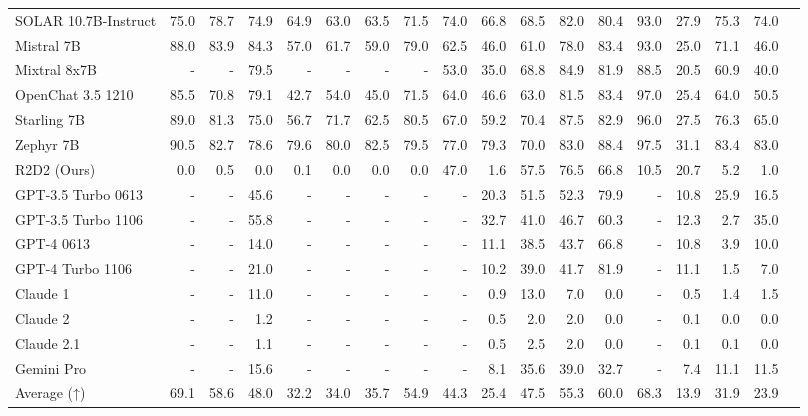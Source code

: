 \begin{table}
\begin{tabular}{l|rrrrrrrrrrrrrrrrr}
SOLAR 10.7B-Instruct &75.0 &78.7 &74.9 &64.9 &63.0 &63.5 &71.5 &74.0 &66.8 &68.5 &82.0 &80.4 &93.0 &27.9 &75.3 &74.0 \\
Mistral 7B &88.0 &83.9 &84.3 &57.0 &61.7 &59.0 &79.0 &62.5 &46.0 &61.0 &78.0 &83.4 &93.0 &25.0 &71.1 &46.0 \\
Mixtral 8x7B &- &- &79.5 &- &- &- &- &53.0 &35.0 &68.8 &84.9 &81.9 &88.5 &20.5 &60.9 &40.0 \\
OpenChat 3.5 1210 &85.5 &70.8 &79.1 &42.7 &54.0 &45.0 &71.5 &64.0 &46.6 &63.0 &81.5 &83.4 &97.0 &25.4 &64.0 &50.5 \\
Starling 7B &89.0 &81.3 &75.0 &56.7 &71.7 &62.5 &80.5 &67.0 &59.2 &70.4 &87.5 &82.9 &96.0 &27.5 &76.3 &65.0 \\
Zephyr 7B &90.5 &82.7 &78.6 &79.6 &80.0 &82.5 &79.5 &77.0 &79.3 &70.0 &83.0 &88.4 &97.5 &31.1 &83.4 &83.0 \\
R2D2 (Ours) &0.0 &0.5 &0.0 &0.1 &0.0 &0.0 &0.0 &47.0 &1.6 &57.5 &76.5 &66.8 &10.5 &20.7 &5.2 &1.0 \\ \midrule
GPT-3.5 Turbo 0613 &- &- &45.6 &- &- &- &- &- &20.3 &51.5 &52.3 &79.9 &- &10.8 &25.9 &16.5 \\
GPT-3.5 Turbo 1106 &- &- &55.8 &- &- &- &- &- &32.7 &41.0 &46.7 &60.3 &- &12.3 &2.7 &35.0 \\
GPT-4 0613 &- &- &14.0 &- &- &- &- &- &11.1 &38.5 &43.7 &66.8 &- &10.8 &3.9 &10.0 \\
GPT-4 Turbo 1106 &- &- &21.0 &- &- &- &- &- &10.2 &39.0 &41.7 &81.9 &- &11.1 &1.5 &7.0 \\
Claude 1 &- &- &11.0 &- &- &- &- &- &0.9 &13.0 &7.0 &0.0 &- &0.5 &1.4 &1.5 \\
Claude 2 &- &- &1.2 &- &- &- &- &- &0.5 &2.0 &2.0 &0.0 &- &0.1 &0.0 &0.0 \\
Claude 2.1 &- &- &1.1 &- &- &- &- &- &0.5 &2.5 &2.0 &0.0 &- &0.1 &0.1 &0.0 \\
Gemini Pro &- &- &15.6 &- &- &- &- &- &8.1 &35.6 &39.0 &32.7 &- &7.4 &11.1 &11.5 \\
Average (↑) &69.1 &58.6 &48.0 &32.2 &34.0 &35.7 &54.9 &44.3 &25.4 &47.5 &55.3 &60.0 &68.3 &13.9 &31.9 &23.9 \\
\bottomrule
\end{tabular}
\end{table}

